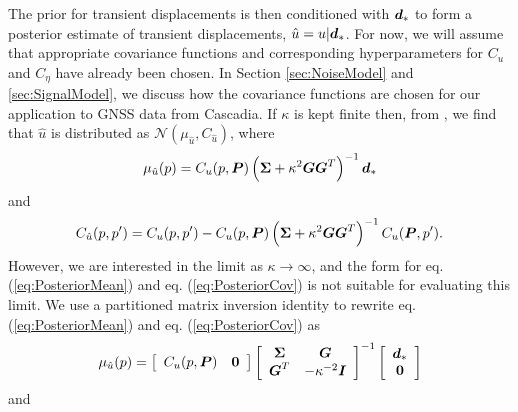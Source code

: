 \documentclass[extra,mreferee]{gji}
\begin{document}
The prior for transient displacements is then conditioned with $\mitbf{d}_*$ to form a posterior estimate of transient displacements, $\hat{u} = u | \mitbf{d}_*$. For now, we will assume that appropriate covariance functions and corresponding hyperparameters for $C_u$ and $C_\eta$ have already been chosen. In Section \ref{sec:NoiseModel} and \ref{sec:SignalModel}, we discuss how the covariance functions are chosen for our application to GNSS data from Cascadia. If $\kappa$ is kept finite then, from \citet[sec. 2.2]{Rasmussen2006}, we find that $\hat{u}$ is distributed as $\mathcal{N}(\mu_{\hat{u}},C_{\hat{u}})$, where
\begin{equation}\label{eq:PosteriorMean}
\mu_{\hat{u}}(p) = C_u(p,\mitbf{P})\left(\mitbf{\Sigma} + \kappa^2\mitbf{G}\mitbf{G}^T\right)^{-1}\mitbf{d}_*
\end{equation}    
and
\begin{equation}\label{eq:PosteriorCov}
C_{\hat{u}}(p,p') = C_u(p,p') - C_u(p,\mitbf{P})\left(\mitbf{\Sigma} + \kappa^2\mitbf{G}\mitbf{G}^T\right)^{-1}C_u(\mitbf{P},p').
\end{equation}
However, we are interested in the limit as $\kappa \to \infty$, and the form for eq. (\ref{eq:PosteriorMean}) and eq. (\ref{eq:PosteriorCov}) is not suitable for evaluating this limit. We use a partitioned matrix inversion identity \citep[sec. 2.7.4]{Press2007} to rewrite eq. (\ref{eq:PosteriorMean}) and eq. (\ref{eq:PosteriorCov}) as
 \begin{equation}\label{eq:PosteriorMean2}
\mu_{\hat{u}}(p) = \left[\begin{array}{cc}
                         C_u(p,\mitbf{P}) & \mitbf{0} \\
                         \end{array}\right]
                   \left[\begin{array}{cc}
                         \mitbf{\Sigma} & \mitbf{G} \\
                         \mitbf{G}^T  & -\kappa^{-2} \mitbf{I} \\
                         \end{array}\right]^{-1}
                   \left[\begin{array}{c}
                         \mitbf{d}_* \\
                         \mitbf{0} \\
                         \end{array}\right]
\end{equation}    
and
\end{document}
